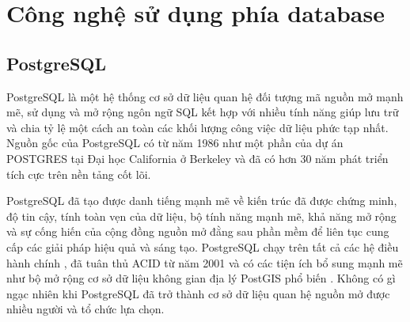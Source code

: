 \documentclass[../20232006p.tex]{subfiles}
\begin{document}
\section{Công nghệ sử dụng phía database}
\subsection{PostgreSQL}

PostgreSQL \cite{postgresql} là một hệ thống cơ sở dữ liệu quan hệ đối tượng mã nguồn mở mạnh mẽ, sử dụng và mở rộng ngôn ngữ SQL kết hợp với nhiều tính năng giúp lưu trữ và chia tỷ lệ một cách an toàn các khối lượng công việc dữ liệu phức tạp nhất. Nguồn gốc của PostgreSQL có từ năm 1986 như một phần của dự án POSTGRES tại Đại học California ở Berkeley và đã có hơn 30 năm phát triển tích cực trên nền tảng cốt lõi. 

PostgreSQL đã tạo được danh tiếng mạnh mẽ về kiến trúc đã được chứng minh, độ tin cậy, tính toàn vẹn của dữ liệu, bộ tính năng mạnh mẽ, khả năng mở rộng và sự cống hiến của cộng đồng nguồn mở đằng sau phần mềm để liên tục cung cấp các giải pháp hiệu quả và sáng tạo. PostgreSQL chạy trên tất cả các hệ điều hành chính , đã tuân thủ ACID từ năm 2001 và có các tiện ích bổ sung mạnh mẽ như bộ mở rộng cơ sở dữ liệu không gian địa lý PostGIS phổ biến . Không có gì ngạc nhiên khi PostgreSQL đã trở thành cơ sở dữ liệu quan hệ nguồn mở được nhiều người và tổ chức lựa chọn.




\end{document}
